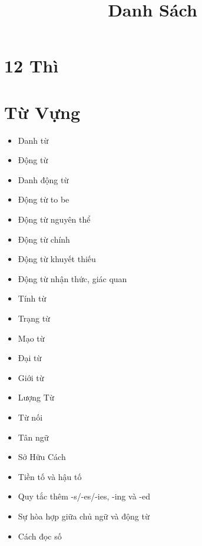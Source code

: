 \title{\Huge \textbf{Danh Sách}}
\maketitle
\tableofcontents

\begin{multicols}{2}
\chapter{12 Thì}
\chapter{Từ Vựng}
\begin{itemize}
    \item Danh từ
	\item Động từ
	\item Danh động từ
	\item Động từ to be
	\item Động từ nguyên thể
	\item Động từ chính
	\item Động từ khuyết thiếu
	\item Động từ nhận thức, giác quan
	\item Tính từ
	\item Trạng từ
	\item Mạo từ
	\item Đại từ
	\item Giới từ
	\item Lượng Từ
	\item Từ nối
	\item Tân ngữ
	\item Sở Hữu Cách
	\item Tiền tố và hậu tố
	\item Quy tắc thêm -s/-es/-ies, -ing và -ed
	\item Sự hòa hợp giữa chủ ngữ và động từ
	\item Cách đọc số
\end{itemize}


\end{multicols}
